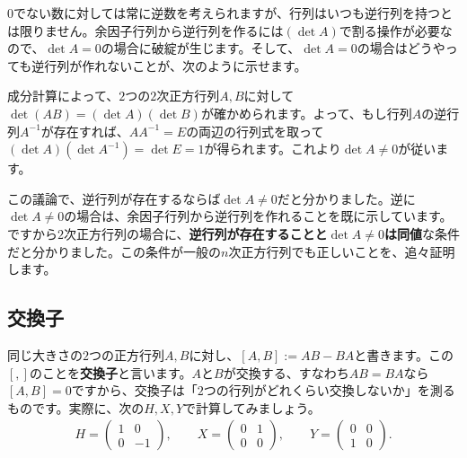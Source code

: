 $0$でない数に対しては常に逆数を考えられますが、行列はいつも逆行列を持つとは限りません。余因子行列から逆行列を作るには$(\det A)$で割る操作が必要なので、$\det A = 0$の場合に破綻が生じます。そして、$\det A = 0$の場合はどうやっても逆行列が作れないことが、次のように示せます。

成分計算によって、$2$つの$2$次正方行列$A, B$に対して$\det (AB) = (\det A)(\det B)$が確かめられます。よって、もし行列$A$の逆行列$A^{-1}$が存在すれば、$A A^{-1} = E$の両辺の行列式を取って$(\det A)(\det A^{-1}) = \det E =1$が得られます。これより$\det A \neq 0$が従います。

この議論で、逆行列が存在するならば$\det A \neq 0$だと分かりました。逆に$\det A \neq 0$の場合は、余因子行列から逆行列を作れることを既に示しています。ですから$2$次正方行列の場合に、\textbf{逆行列が存在することと$\det A \neq 0$は同値}な条件だと分かりました。この条件が一般の$n$次正方行列でも正しいことを、追々証明します。

\subsection{交換子}
同じ大きさの$2$つの正方行列$A, B$に対し、$[A, B] := AB - BA$と書きます。この$[,]$のことを\textbf{交換子}と言います。$A$と$B$が交換する、すなわち$AB = BA$なら$[A, B] = 0$ですから、交換子は「$2$つの行列がどれくらい交換しないか」を測るものです。実際に、次の$H, X, Y$で計算してみましょう。
\begin{align*}
H =
\begin{pmatrix}
1 & 0 \\
0 & -1
\end{pmatrix}, \qquad
X =
\begin{pmatrix}
0 & 1 \\
0 & 0
\end{pmatrix}, \qquad
Y =
\begin{pmatrix}
0 & 0 \\
1 & 0
\end{pmatrix}.
\end{align*}

